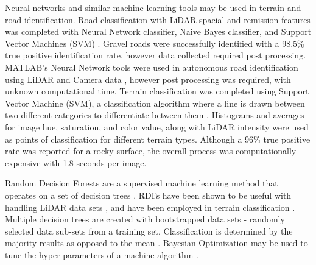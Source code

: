 \documentclass[journal,onecolumn]{IEEEtran}
\begin{document}
	{Neural networks and similar machine learning tools may be used in terrain and road identification. Road classification with LiDAR spacial and remission features was completed with Neural Network classifier, Naive Bayes classifier, and Support Vector Machines (SVM) \cite{wang_road_nodate,wang_two-stage_2018}. Gravel roads were successfully identified with a 98.5\% true positive identification rate, however data collected required post processing. MATLAB's Neural Network tools were used in autonomous road identification using LiDAR and Camera data \cite{rasmussen_combining_2002}, however post processing was required, with unknown computational time.  Terrain classification was completed using Support Vector Machine (SVM), a classification algorithm where a line is drawn between two different categories to differentiate between them \cite{breiman_random_2001}. Histograms and averages for image hue, saturation, and color value, along with LiDAR intensity were used as points of classification for different terrain types. Although a 96\% true positive rate was reported for a rocky surface, the overall process was computationally expensive with 1.8 seconds per image.}
	
	
	{Random Decision Forests are a supervised machine learning method that operates on a set of decision trees \cite{ho_random_1995}. RDFs have been shown to be useful with handling LiDAR data sets \cite{breiman_random_2001}, and have been employed in terrain classification \cite{laible_3d_2012,laible_map_building,laible_terrain_2013,khan_high_2011,reymann_improving_2015,schilling_geometric_2017, wietrzykowski_context-aware_2019}. Multiple decision trees are created with bootstrapped data sets - randomly selected data sub-sets from a training set. Classification is determined by the majority results as opposed to the mean \cite{breiman_random_2001,ho_random_1995}. Bayesian Optimization may be used to tune the hyper parameters of a machine algorithm \cite{noauthor_bayesian_nodate, snoek_practical_2012}.}
\end{document}
